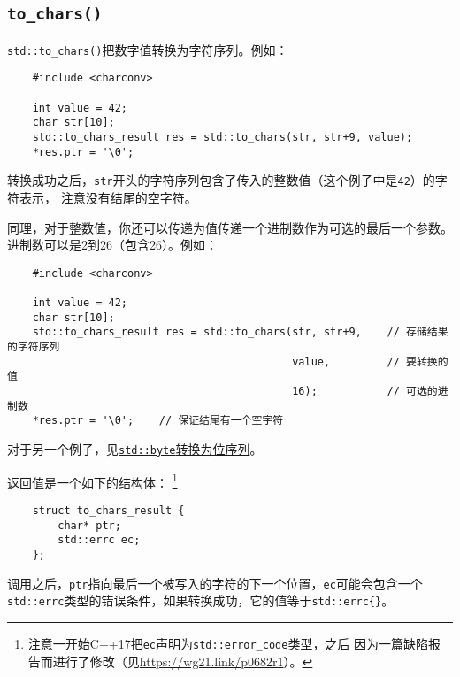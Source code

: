 \subsection{\texttt{to\_chars()}}\label{ch31.2.2}
\texttt{std::to\_chars()}把数字值转换为字符序列。例如：
\begin{lstlisting}
    #include <charconv>

    int value = 42;
    char str[10];
    std::to_chars_result res = std::to_chars(str, str+9, value);
    *res.ptr = '\0';
\end{lstlisting}
转换成功之后，\texttt{str}开头的字符序列包含了传入的整数值（这个例子中是\texttt{42}）的字符表示，
注意没有结尾的空字符。

同理，对于整数值，你还可以传递为值传递一个进制数作为可选的最后一个参数。
进制数可以是2到26（包含26）。例如：
\begin{lstlisting}
    #include <charconv>

    int value = 42;
    char str[10];
    std::to_chars_result res = std::to_chars(str, str+9,    // 存储结果的字符序列
                                             value,         // 要转换的值
                                             16);           // 可选的进制数
    *res.ptr = '\0';    // 保证结尾有一个空字符
\end{lstlisting}
对于另一个例子，见\hyperref[byte到位序列]{\texttt{std::byte}转换为位序列}。

返回值是一个如下的结构体：
\footnote{注意一开始C++17把\texttt{ec}声明为\texttt{std::error\_code}类型，之后
因为一篇缺陷报告而进行了修改（见\url{https://wg21.link/p0682r1}）。}
\begin{lstlisting}
    struct to_chars_result {
        char* ptr;
        std::errc ec;
    };
\end{lstlisting}
调用之后，\texttt{ptr}指向最后一个被写入的字符的下一个位置，\texttt{ec}可能会包含一个
\texttt{std::errc}类型的错误条件，如果转换成功，它的值等于\texttt{std::errc\{\}}。

